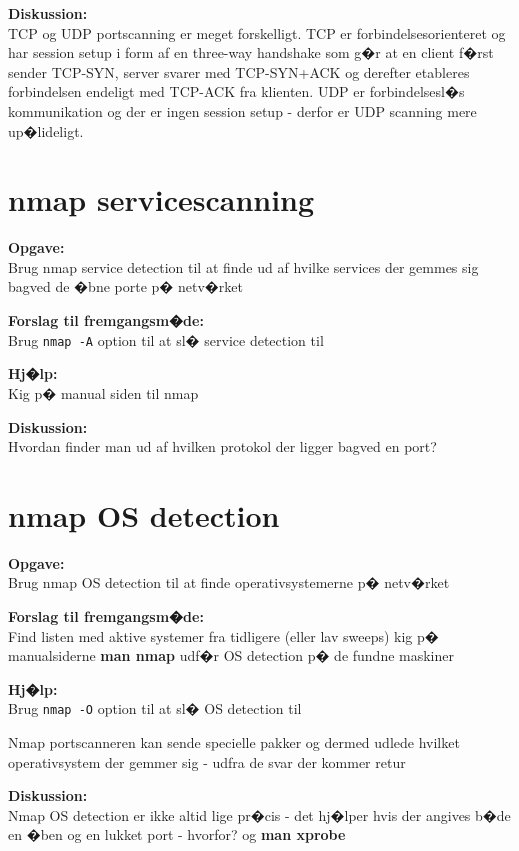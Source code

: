 \documentclass[a4paper,11pt,notitlepage]{oevelser}
\begin{document}
{\bfseries Diskussion:}\\
TCP og UDP portscanning er meget forskelligt. TCP er
forbindelsesorienteret og har session setup i form af en three-way
handshake som g�r at en client f�rst sender TCP-SYN, server svarer med
TCP-SYN+ACK og derefter etableres forbindelsen endeligt med TCP-ACK fra
klienten. UDP er forbindelsesl�s kommunikation og der er ingen session
setup - derfor er UDP scanning mere up�lideligt.

\chapter{nmap servicescanning}
\label{ex:nmap-service}

{\bfseries Opgave:} \\
Brug nmap service detection til at finde ud af hvilke services der
gemmes sig bagved de �bne porte p� netv�rket

{\bfseries Forslag til fremgangsm�de:}\\
Brug \verb+nmap -A+ option til at sl� service detection til

{\bfseries Hj�lp:} \\
Kig p� manual siden til nmap

{\bfseries Diskussion:}\\
Hvordan finder man ud af hvilken protokol der ligger bagved en port?


\chapter{nmap OS detection}
\label{ex:nmap-os}

{\bfseries Opgave:} \\
Brug nmap OS detection til at finde operativsystemerne p� netv�rket

{\bfseries Forslag til fremgangsm�de:}\\
Find listen med aktive systemer fra tidligere (eller lav sweeps)
kig p� manualsiderne {\bfseries man nmap}
udf�r OS detection p� de fundne maskiner

{\bfseries Hj�lp:} \\
Brug \verb+nmap -O+ option til at sl� OS detection til

Nmap portscanneren kan sende specielle pakker og dermed udlede hvilket
operativsystem der gemmer sig - udfra de svar der kommer retur

{\bfseries Diskussion:}\\
Nmap OS detection er ikke altid lige pr�cis - det hj�lper hvis der
angives b�de en �ben og en lukket port - hvorfor?
og {\bfseries man xprobe}
\end{document}
